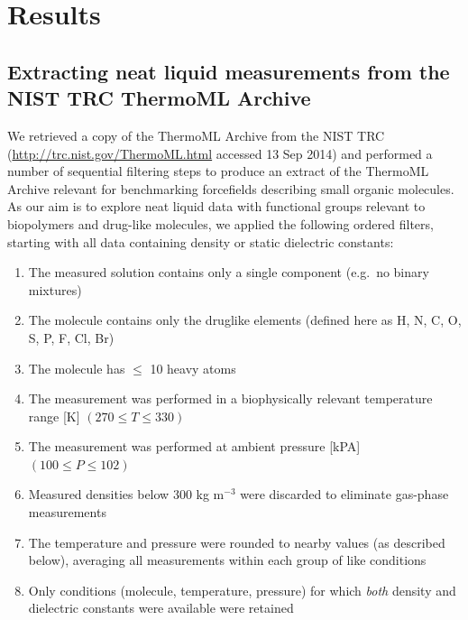 \documentclass[aps,pre,twocolumn,nofootinbib,superscriptaddress,linenumbers]{revtex4-1}
\begin{document}

\section{Results}

\subsection{Extracting neat liquid measurements from the NIST TRC ThermoML Archive}
\label{section:filtering-thermoml}

We retrieved a copy of the ThermoML Archive from the NIST TRC (\url{http://trc.nist.gov/ThermoML.html} accessed 13 Sep 2014) and performed a number of sequential filtering steps to produce an extract of the ThermoML Archive relevant for benchmarking forcefields describing small organic molecules.  
As our aim is to explore neat liquid data with functional groups relevant to biopolymers and drug-like molecules, we applied the following ordered filters, starting with all data containing density or static dielectric constants: 
\begin{enumerate}
 \item The measured solution contains only a single component (e.g.~no binary mixtures)
 \item The molecule contains only the druglike elements (defined here as H, N, C, O, S, P, F, Cl, Br)
 \item The molecule has $\le$ 10 heavy atoms
 \item The measurement was performed in a biophysically relevant temperature range [K] $(270 \le T \le 330)$
 \item The measurement was performed at ambient pressure [kPA] $(100 \le P \le 102)$
 \item Measured densities below 300 kg m$^{-3}$ were discarded to eliminate gas-phase measurements
 \item The temperature and pressure were rounded to nearby values (as described below), averaging all measurements within each group of like conditions
 \item Only conditions (molecule, temperature, pressure) for which \emph{both} density and dielectric constants were available were retained
\end{enumerate}
\end{document}
